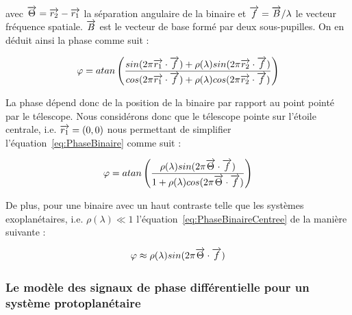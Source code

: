 avec $\overrightarrow{\Theta} = \overrightarrow{r_2} - \overrightarrow{r_1}$ la séparation angulaire de la binaire et $\overrightarrow{f} = \overrightarrow{B} / \lambda$ le vecteur fréquence spatiale. $\overrightarrow{B}$ est le vecteur de base formé par deux sous-pupilles. On en déduit ainsi la phase comme suit :

\begin{equation}
    \varphi = atan \left( \frac{sin(2\pi \overrightarrow{r_1} \cdot \overrightarrow{f}) + \rho(\lambda) sin(2\pi \overrightarrow{r_2} \cdot \overrightarrow{f})}{cos(2\pi \overrightarrow{r_1} \cdot \overrightarrow{f}) + \rho(\lambda) cos(2\pi \overrightarrow{r_2} \cdot \overrightarrow{f})} \right) \label{eq:PhaseBinaire}
\end{equation}

La phase dépend donc de la position de la binaire par rapport au point pointé par le télescope. Nous considérons donc que le télescope pointe sur l'étoile centrale, i.e. $\overrightarrow{r_1} = (0, 0)$ nous permettant de simplifier l'équation~\ref{eq:PhaseBinaire} comme suit :

\begin{equation}
    \varphi = atan \left( \frac{\rho(\lambda) sin(2\pi \overrightarrow{\Theta} \cdot \overrightarrow{f})}{1 + \rho(\lambda) cos(2\pi \overrightarrow{\Theta} \cdot \overrightarrow{f})} \right) \label{eq:PhaseBinaireCentree}
\end{equation}

De plus, pour une binaire avec un haut contraste telle que les systèmes exoplanétaires, i.e. $\rho(\lambda) \ll 1$ l'équation~\ref{eq:PhaseBinaireCentree} de la manière suivante :

\begin{equation}
    \varphi \approx \rho(\lambda) sin(2\pi \overrightarrow{\Theta} \cdot \overrightarrow{f})
    \label{eq:PhaseBinaireHautContraste}
\end{equation}


\subsubsection{Le modèle des signaux de phase différentielle pour un système protoplanétaire}

